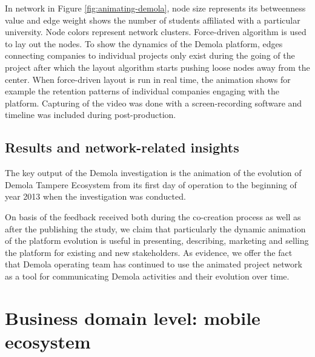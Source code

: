 In network in Figure \ref{fig:animating-demola}, node size represents its betweenness value and edge weight shows the number of students affiliated with a particular university. Node colors represent network clusters. Force-driven algorithm is used to lay out the nodes. To show the dynamics of the Demola platform, edges connecting companies to individual projects only exist during the going of the project after which the layout algorithm starts pushing loose nodes away from the center. When force-driven layout is run in real time, the animation shows for example the retention patterns of individual companies engaging with the platform. Capturing of the video was done with a screen-recording software and timeline was included during post-production.

\subsection{Results and network-related insights}

The key output of the Demola investigation is the animation of the evolution of Demola Tampere Ecosystem from its first day of operation to the beginning of year 2013 when the investigation was conducted.

On basis of the feedback received both during the co-creation process as well as after the publishing the study, we claim that particularly the dynamic animation of the platform evolution is useful in presenting, describing, marketing and selling the platform for existing and new stakeholders. As evidence, we offer the fact that Demola operating team has continued to use the animated project network as a tool for communicating Demola activities and their evolution over time.

\section{Business domain level: mobile ecosystem}

